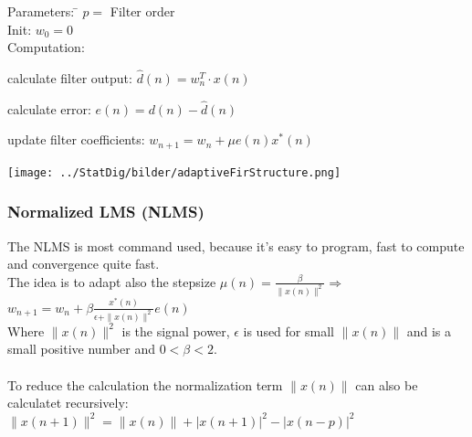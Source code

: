 \begin{minipage}{9cm}
  \begin{tabbing}
  	Parameters:  \= $p= $ Filter order\\
  	Init:		\> $w_0= 0$\\
  	Computation:
  \end{tabbing}	
      \begin{aufzaehlung}
          \item calculate filter output: $\hat{d}(n) = w_n^T\cdot x(n)$ 
          \item calculate error: $e(n) = d(n) - \hat{d}(n)$
          \item update filter coefficients: $w_{n+1}=w_n+\mu e(n)x^*(n)$  
      \end{aufzaehlung}\vspace{0.05cm}

\end{minipage} 
\begin{minipage}{10cm}
  \texttt{[image: ../StatDig/bilder/adaptiveFirStructure.png]}
\end{minipage}

\subsubsection{Normalized LMS (NLMS) }
The NLMS is most command used, because it's easy to program, fast to compute and convergence quite fast.\\
The idea is to adapt also the stepsize $\mu(n)=\frac{\beta}{\|x(n)\|^2} \Rightarrow $
$\boxed{w_{n+1}=w_n +\beta \frac{x^*(n)}{\epsilon+\|x(n)\|^2}e(n)}$\\
Where $\|x(n)\|^2$ is the signal power, $\epsilon$ is used for small $\|x(n)\|$ and is a small positive number and $0<\beta<2$.\\\\
To reduce the calculation the normalization term $\|x(n)\|$ can also be calculatet recursively:\\ $\|x(n+1)\|^2 =  \|x(n)\| + |x(n+1)|^2 -|x(n-p)|^2$

